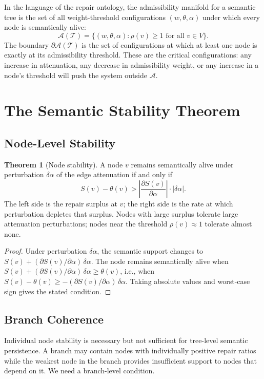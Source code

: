 \documentclass[11pt, a4paper]{article}
\theoremstyle{definition}
\newtheorem{theorem}{Theorem}
\theoremstyle{remark}
\begin{document}
In the language of the repair ontology, the admissibility manifold for a
semantic tree is the set of all weight-threshold configurations
$(w, \theta, \alpha)$ under which every node is semantically alive:
\[
\mathcal{A}(\mathcal{T}) = \{(w, \theta, \alpha) : \rho(v) \geq 1 \text{ for all } v \in V\}.
\]
The boundary $\partial\mathcal{A}(\mathcal{T})$ is the set of configurations
at which at least one node is exactly at its admissibility threshold. These
are the critical configurations: any increase in attenuation, any decrease in
admissibility weight, or any increase in a node's threshold will push the
system outside $\mathcal{A}$.

\section{The Semantic Stability Theorem}

\subsection{Node-Level Stability}

\begin{theorem}[Node stability]
A node $v$ remains semantically alive under perturbation $\delta\alpha$ of
the edge attenuation if and only if
\[
S(v) - \theta(v) > \left|\frac{\partial S(v)}{\partial \alpha}\right| \cdot |\delta\alpha|.
\]
The left side is the repair surplus at $v$; the right side is the rate at which
perturbation depletes that surplus. Nodes with large surplus tolerate large
attenuation perturbations; nodes near the threshold $\rho(v) \approx 1$
tolerate almost none.
\end{theorem}

\begin{proof}
Under perturbation $\delta\alpha$, the semantic support changes to
$S(v) + (\partial S(v)/\partial\alpha)\,\delta\alpha$. The node remains
semantically alive when $S(v) + (\partial S(v)/\partial\alpha)\,\delta\alpha \geq \theta(v)$,
i.e., when $S(v) - \theta(v) \geq -(\partial S(v)/\partial\alpha)\,\delta\alpha$.
Taking absolute values and worst-case sign gives the stated condition.
\end{proof}

\subsection{Branch Coherence}

Individual node stability is necessary but not sufficient for tree-level
semantic persistence. A branch may contain nodes with individually positive
repair ratios while the weakest node in the branch provides insufficient
support to nodes that depend on it. We need a branch-level condition.
\end{document}
